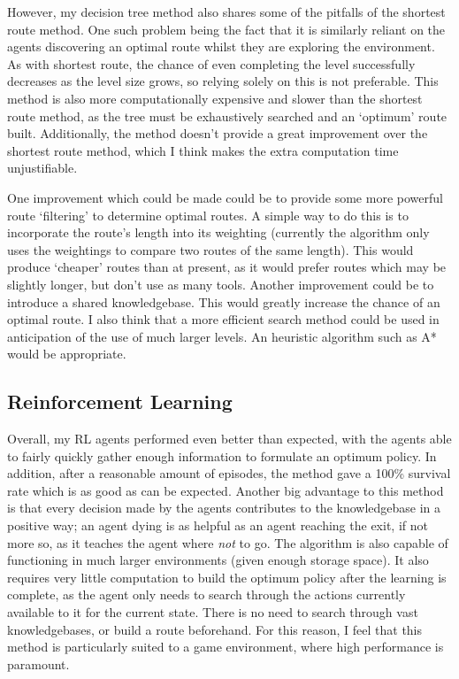 \documentclass[a4paper,oneside]{report}
\begin{document}
However, my decision tree method also shares some of the pitfalls of the shortest route method. One such problem being the fact that it is similarly reliant on the agents discovering an optimal route whilst they are exploring the environment. As with shortest route, the chance of even completing the level successfully decreases as the level size grows, so relying solely on this is not preferable. This method is also more computationally expensive and slower than the shortest route method, as the tree must be exhaustively searched and an `optimum' route built. Additionally, the method doesn't provide a great improvement over the shortest route method, which I think makes the extra computation time unjustifiable.

One improvement which could be made could be to provide some more powerful route `filtering' to determine optimal routes. A simple way to do this is to incorporate the route's length into its weighting (currently the algorithm only uses the weightings to compare two routes of the same length). This would produce `cheaper' routes than at present, as it would prefer routes which may be slightly longer, but don't use as many tools. Another improvement could be to introduce a shared knowledgebase. This would greatly increase the chance of an optimal route. I also think that a more efficient search method could be used in anticipation of the use of much larger levels. An heuristic algorithm such as A* would be appropriate.

\subsection{Reinforcement Learning}

Overall, my RL agents performed even better than expected, with the agents able to fairly quickly gather enough information to formulate an optimum policy. In addition, after a reasonable amount of episodes, the method gave a 100\% survival rate which is as good as can be expected. Another big advantage to this method is that every decision made by the agents contributes to the knowledgebase in a positive way; an agent dying is as helpful as an agent reaching the exit, if not more so, as it teaches the agent where \emph{not} to go. The algorithm is also capable of functioning in much larger environments (given enough storage space). It also requires very little computation to build the optimum policy after the learning is complete, as the agent only needs to search through the actions currently available to it for the current state. There is no need to search through vast knowledgebases, or build a route beforehand. For this reason, I feel that this method is particularly suited to a game environment, where high performance is paramount.
\end{document}
